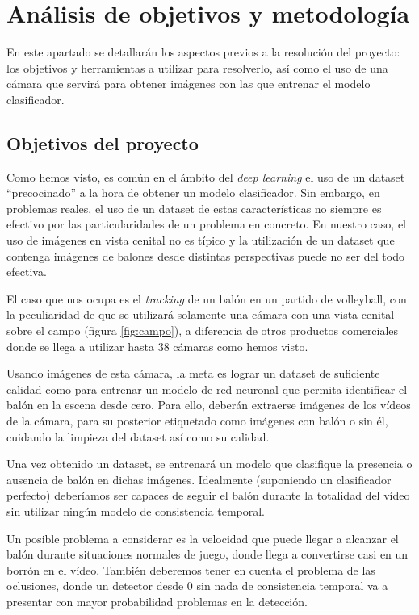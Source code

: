 \section{Análisis de objetivos y metodología}

En este apartado se detallarán los aspectos previos a la resolución del proyecto: los objetivos y herramientas a utilizar para resolverlo, así como el uso de una cámara que servirá para obtener imágenes con las que entrenar el modelo clasificador.

\subsection{Objetivos del proyecto}

Como hemos visto, es común en el ámbito del \textit{deep learning} el uso de un dataset ``precocinado'' a la hora de obtener un modelo clasificador. Sin embargo, en problemas reales, el uso de un dataset de estas características no siempre es efectivo por las particularidades de un problema en concreto. En nuestro caso, el uso de imágenes en vista cenital no es típico y la utilización de un dataset que contenga imágenes de balones desde distintas perspectivas puede no ser del todo efectiva.

El caso que nos ocupa es el \textit{tracking} de un balón en un partido de volleyball, con la peculiaridad de que se utilizará solamente una cámara con una vista cenital sobre el campo (figura \ref{fig:campo}), a diferencia de otros productos comerciales donde se llega a utilizar hasta 38 cámaras como hemos visto.

Usando imágenes de esta cámara, la meta es lograr un dataset de suficiente calidad como para entrenar un modelo de red neuronal que permita identificar el balón en la escena desde cero. Para ello, deberán extraerse imágenes de los vídeos de la cámara, para su posterior etiquetado como imágenes con balón o sin él, cuidando la limpieza del dataset así como su calidad.

Una vez obtenido un dataset, se entrenará un modelo que clasifique la presencia o ausencia de balón en dichas imágenes. Idealmente (suponiendo un clasificador perfecto) deberíamos ser capaces de seguir el balón durante la totalidad del vídeo sin utilizar ningún modelo de consistencia temporal.

Un posible problema a considerar es la velocidad que puede llegar a alcanzar el balón durante situaciones normales de juego, donde llega a convertirse casi en un borrón en el vídeo. También deberemos tener en cuenta el problema de las oclusiones, donde un detector desde 0 sin nada de consistencia temporal va a presentar con mayor probabilidad problemas en la detección.

